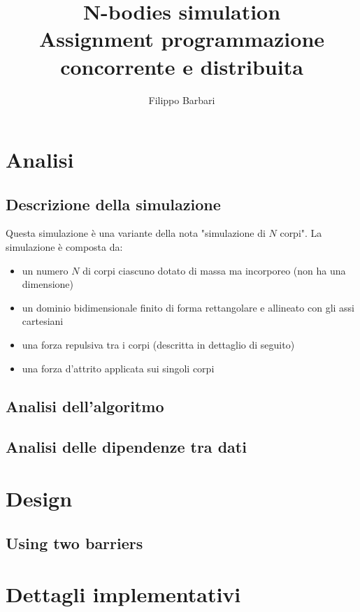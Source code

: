 \documentclass[12pt,a4paper,oneside]{article}
\begin{document}
	
	\title{N-bodies simulation\\Assignment programmazione concorrente e distribuita}
	\author{Filippo Barbari}
	\date{}%
	\maketitle
	
	\tableofcontents
	\newpage
	
	\section{Analisi}
	\subsection{Descrizione della simulazione}
	Questa simulazione è una variante della nota "simulazione di $N$ corpi". La simulazione è composta da:
	\begin{itemize}
		\item un numero $N$ di corpi ciascuno dotato di massa ma incorporeo (non ha una dimensione)
		\item un dominio bidimensionale finito di forma rettangolare e allineato con gli assi cartesiani
		\item una forza repulsiva tra i corpi (descritta in dettaglio di seguito)
		\item una forza d'attrito applicata sui singoli corpi
	\end{itemize}
	
	\subsection{Analisi dell'algoritmo}
	\subsection{Analisi delle dipendenze tra dati}
	
	\section{Design}
	\subsection{Using two barriers}
	
	\section{Dettagli implementativi}
	
\end{document}
